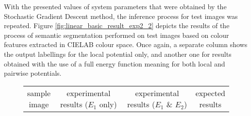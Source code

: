 With the presented values of system parameters that were obtained by the Stochastic Gradient Descent method, the inference process for test images was repeated. Figure \ref{fig:linear_basic_result_exp2_2} depicts the results of the process of semantic segmentation performed on test images based on colour features extracted in CIELAB colour space. Once again, a separate column shows the output labellings for the local potential only, and another one for results obtained with the use of a full energy function meaning for both local and pairwise potentials.
\begin{figure}[!htb]
 \centering
    \begin{tabular}{cccc}
        \thead{sample \\ image} & \thead{experimental results \\ ($E_1$ only)} & \thead{experimental results \\ ($E_1$ \& $E_2$)} & \thead{expected \\ results} \\


\end{tabular}
\end{figure}
